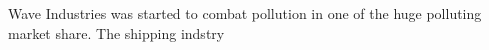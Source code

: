 \documentclass[../main.tex]{subfiles}
\begin{document}
	Wave Industries was started to combat pollution in one of the huge polluting market share. The shipping indstry 
		
	
\end{document}
